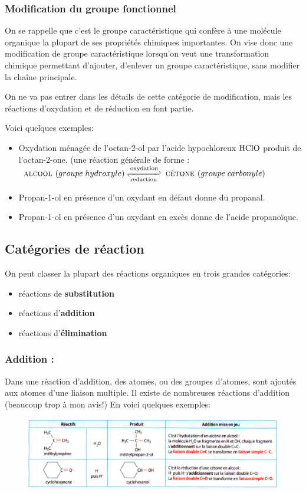 \documentclass[11pt,a4paper]{article}
\begin{document}
\subsubsection{Modification du groupe fonctionnel}

On se rappelle que c’est le groupe caractéristique qui confère à une molécule organique la plupart de ses propriétés chimiques importantes. On vise donc une modification de groupe caractéristique lorsqu’on veut une transformation chimique permettant d’ajouter, d’enlever un groupe caractéristique, sans modifier la chaîne principale. 

On ne va pas entrer dans les détails de cette catégorie de modification, mais les réactions d’oxydation et de réduction en font partie.  

Voici quelques exemples: 
\begin{itemize}
    \item Oxydation ménagée de l’octan-2-ol par l’acide hypochloreux $\ce{HClO}$ produit de l’octan-2-one.
    (une réaction générale de forme : $\textsc{ alcool }(groupe\; hydroxyle) \ce{<=>[oxydation][reduction]} \textsc{ cétone }(groupe\; carbonyle)$
    \item Propan-1-ol en présence d’un oxydant en défaut donne du propanal.
    \item Propan-1-ol en présence d’un oxydant en excès donne de l’acide propanoïque.
\end{itemize}

\subsection{Catégories de réaction}
On peut classer la plupart des réactions organiques en trois grandes catégories: 
\begin{itemize}
    \item réactions de \textbf{substitution}
    \item réactions d’\textbf{addition}
    \item réactions d’\textbf{élimination}
\end{itemize}

\subsubsection*{Addition : }
Dans une réaction d’addition, des atomes, ou des groupes d’atomes, sont ajoutés aux atomes d’une liaison multiple. Il existe de nombreuses réactions d’addition (beaucoup trop à mon avis!) En voici quelques exemples: 
\begin{figure}[H]
    \centering
    \includegraphics[width=0.8\linewidth]{imgs/c5/addtion.jpg}
\end{figure}
\end{document}
